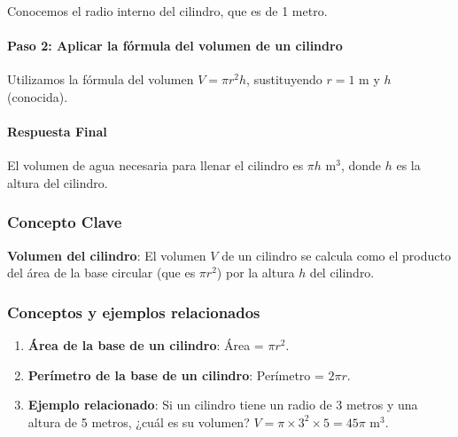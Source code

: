 \documentclass[
]{article}
\providecommand{\tightlist}{%
  \setlength{\itemsep}{0pt}\setlength{\parskip}{0pt}}
\begin{document}
Conocemos el radio interno del cilindro, que es de 1 metro.

\paragraph{\texorpdfstring{\textbf{Paso 2: Aplicar la fórmula del
volumen de un
cilindro}}{Paso 2: Aplicar la fórmula del volumen de un cilindro}}\label{paso-2-aplicar-la-fuxf3rmula-del-volumen-de-un-cilindro}

Utilizamos la fórmula del volumen \(V = \pi r^2 h\), sustituyendo
\(r = 1 \text{ m}\) y \(h\) (conocida).

\paragraph{\texorpdfstring{\textbf{Respuesta
Final}}{Respuesta Final}}\label{respuesta-final}

El volumen de agua necesaria para llenar el cilindro es
\(\pi h \text{ m}^3\), donde \(h\) es la altura del cilindro.

\subsubsection{\texorpdfstring{\textbf{Concepto
Clave}}{Concepto Clave}}\label{concepto-clave}

\textbf{Volumen del cilindro}: El volumen \(V\) de un cilindro se
calcula como el producto del área de la base circular (que es
\(\pi r^2\)) por la altura \(h\) del cilindro.

\subsubsection{\texorpdfstring{\textbf{Conceptos y ejemplos
relacionados}}{Conceptos y ejemplos relacionados}}\label{conceptos-y-ejemplos-relacionados}

\begin{enumerate}
\def\labelenumi{\arabic{enumi}.}
\tightlist
\item
  \textbf{Área de la base de un cilindro}: Área = \(\pi r^2\).
\item
  \textbf{Perímetro de la base de un cilindro}: Perímetro = \(2\pi r\).
\item
  \textbf{Ejemplo relacionado}: Si un cilindro tiene un radio de 3
  metros y una altura de 5 metros, ¿cuál es su volumen?
  \(V = \pi \times 3^2 \times 5 = 45\pi \text{ m}^3\).
\end{enumerate}
\end{document}
